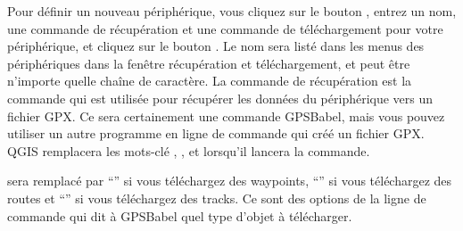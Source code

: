 Pour définir un nouveau périphérique, vous cliquez sur le bouton , entrez un nom, une commande de récupération et
une commande de téléchargement pour votre périphérique, et cliquez sur le bouton .
Le nom sera listé dans les menus des périphériques dans la fenêtre récupération et téléchargement, et peut être n'importe quelle chaîne de caractère.
La commande de récupération est la commande qui est utilisée pour récupérer les données du périphérique vers un fichier GPX.
Ce sera certainement une commande GPSBabel, mais vous pouvez utiliser un autre programme en ligne de commande qui créé un fichier GPX.
QGIS remplacera les mots-clé , , et  lorsqu'il lancera la commande.

 sera remplacé par {}``''  si vous téléchargez des waypoints, {}``'' si vous téléchargez des routes et
{}``'' si vous téléchargez des tracks.
Ce sont des options de la ligne de commande qui dit à GPSBabel quel type d'objet  à télécharger.

